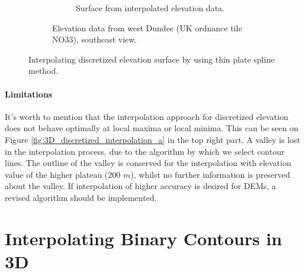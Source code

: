\documentclass[a4paper,10pt]{report}
\begin{document}
\begin{figure}[H]
\begin{subfigure}{\textwidth}
\begin{subfigure}{.49\textwidth}
        \addtocounter{subfigure}{-1}
        \renewcommand\thesubfigure{\alph{subfigure}) ii}
        \caption{Surface from interpolated elevation data.}
        \end{subfigure}
        \addtocounter{subfigure}{-1}
        \renewcommand\thesubfigure{\alph{subfigure}}
        \caption{Elevation data from west Dundee (UK ordnance tile NO33), southeast view.}
        \label{fig:3D_discretized_interpolation_b}
    \end{subfigure}
    \caption{Interpolating discretized elevation surface by using thin plate spline method.}
    \label{fig:3D_discretized_interpolation}
\end{figure}

\subsubsection{Limitations}
It's worth to mention that the interpolation approach for discretized elevation does not behave optimally at local maxima or local minima. This can be seen on Figure \ref{fig:3D_discretized_interpolation_a} in the top right part. A valley is lost in the interpolation process, due to the algorithm by which we select contour lines. The outline of the valley is conserved for the interpolation with elevation value of the higher plateau ($200$ $m$), whilst no further information is preserved about the valley. If interpolation of higher accuracy is desired for DEMs, a revised algorithm should be implemented.

\chapter{Interpolating Binary Contours in 3D}
\end{document}
